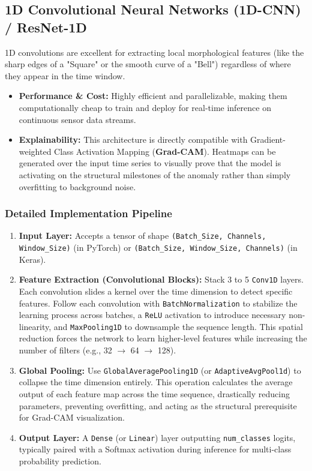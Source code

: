 \subsection{1D Convolutional Neural Networks (1D-CNN) / ResNet-1D}
1D convolutions are excellent for extracting local morphological features (like the sharp edges of a "Square" or the smooth curve of a "Bell") regardless of where they appear in the time window.
\begin{itemize}
    \item \textbf{Performance \& Cost:} Highly efficient and parallelizable, making them computationally cheap to train and deploy for real-time inference on continuous sensor data streams.
    \item \textbf{Explainability:} This architecture is directly compatible with Gradient-weighted Class Activation Mapping (\textbf{Grad-CAM}). Heatmaps can be generated over the input time series to visually prove that the model is activating on the structural milestones of the anomaly rather than simply overfitting to background noise.
\end{itemize}

\subsubsection*{Detailed Implementation Pipeline}
\begin{enumerate}
    \item \textbf{Input Layer:} Accepts a tensor of shape \texttt{(Batch\_Size, Channels, Window\_Size)} (in PyTorch) or \texttt{(Batch\_Size, Window\_Size, Channels)} (in Keras).
    \item \textbf{Feature Extraction (Convolutional Blocks):} Stack 3 to 5 \texttt{Conv1D} layers. Each convolution slides a kernel over the time dimension to detect specific features. Follow each convolution with \texttt{BatchNormalization} to stabilize the learning process across batches, a \texttt{ReLU} activation to introduce necessary non-linearity, and \texttt{MaxPooling1D} to downsample the sequence length. This spatial reduction forces the network to learn higher-level features while increasing the number of filters (e.g., 32 $\rightarrow$ 64 $\rightarrow$ 128).
    \item \textbf{Global Pooling:} Use \texttt{GlobalAveragePooling1D} (or \texttt{AdaptiveAvgPool1d}) to collapse the time dimension entirely. This operation calculates the average output of each feature map across the time sequence, drastically reducing parameters, preventing overfitting, and acting as the structural prerequisite for Grad-CAM visualization.
    \item \textbf{Output Layer:} A \texttt{Dense} (or \texttt{Linear}) layer outputting \texttt{num\_classes} logits, typically paired with a Softmax activation during inference for multi-class probability prediction.
\end{enumerate}


